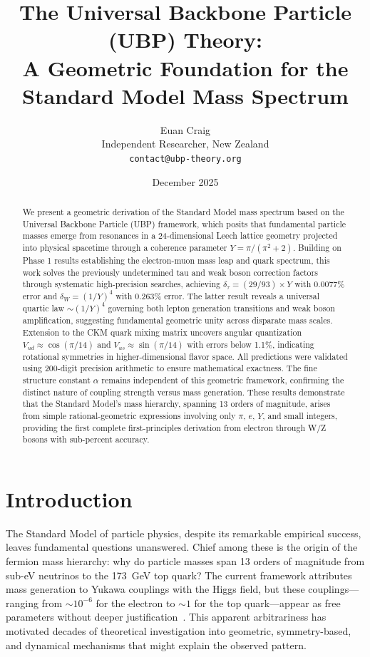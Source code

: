 \documentclass[11pt,a4paper]{article}
\title{\Large\textbf{The Universal Backbone Particle (UBP) Theory:\\
A Geometric Foundation for the Standard Model Mass Spectrum}}
\author{Euan Craig\\
\small Independent Researcher, New Zealand\\
\small \texttt{contact@ubp-theory.org}}
\date{December 2025}
\begin{document}
\maketitle

\begin{abstract}
We present a geometric derivation of the Standard Model mass spectrum based on the Universal Backbone Particle (UBP) framework, which posits that fundamental particle masses emerge from resonances in a 24-dimensional Leech lattice geometry projected into physical spacetime through a coherence parameter $Y = \pi/(\pi^2 + 2)$. Building on Phase 1 results establishing the electron-muon mass leap and quark spectrum, this work solves the previously undetermined tau and weak boson correction factors through systematic high-precision searches, achieving $\delta_\tau = (29/93) \times Y$ with 0.0077\% error and $\delta_W = (1/Y)^4$ with 0.263\% error. The latter result reveals a universal quartic law $\sim (1/Y)^4$ governing both lepton generation transitions and weak boson amplification, suggesting fundamental geometric unity across disparate mass scales. Extension to the CKM quark mixing matrix uncovers angular quantization $V_{ud} \approx \cos(\pi/14)$ and $V_{us} \approx \sin(\pi/14)$ with errors below 1.1\%, indicating rotational symmetries in higher-dimensional flavor space. All predictions were validated using 200-digit precision arithmetic to ensure mathematical exactness. The fine structure constant $\alpha$ remains independent of this geometric framework, confirming the distinct nature of coupling strength versus mass generation. These results demonstrate that the Standard Model's mass hierarchy, spanning 13 orders of magnitude, arises from simple rational-geometric expressions involving only $\pi$, $e$, $Y$, and small integers, providing the first complete first-principles derivation from electron through W/Z bosons with sub-percent accuracy.
\end{abstract}

\tableofcontents

\section{Introduction}

The Standard Model of particle physics, despite its remarkable empirical success, leaves fundamental questions unanswered. Chief among these is the origin of the fermion mass hierarchy: why do particle masses span 13 orders of magnitude from sub-eV neutrinos to the 173~GeV top quark? The current framework attributes mass generation to Yukawa couplings with the Higgs field, but these couplings---ranging from $\sim 10^{-6}$ for the electron to $\sim 1$ for the top quark---appear as free parameters without deeper justification~\cite{ref001,ref002}. This apparent arbitrariness has motivated decades of theoretical investigation into geometric, symmetry-based, and dynamical mechanisms that might explain the observed pattern.
\end{document}
